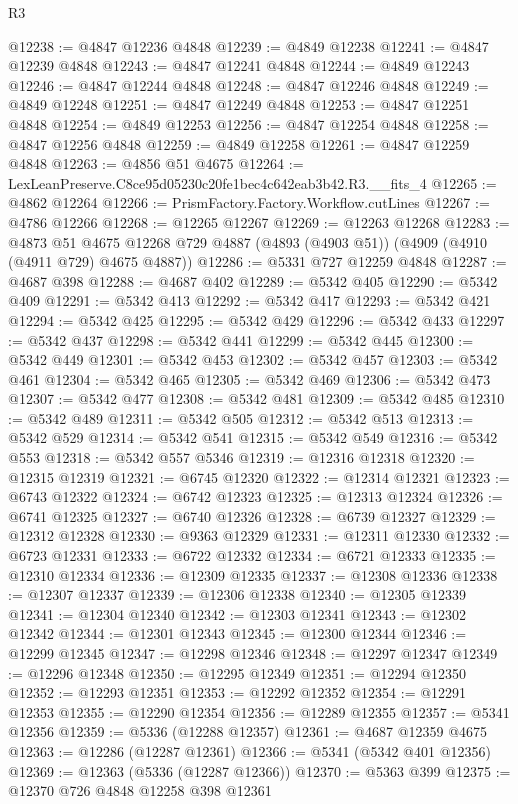 \begin{lexlean}{R3}
\begin{coremodule}
@12238 := @4847 @12236 @4848
@12239 := @4849 @12238
@12241 := @4847 @12239 @4848
@12243 := @4847 @12241 @4848
@12244 := @4849 @12243
@12246 := @4847 @12244 @4848
@12248 := @4847 @12246 @4848
@12249 := @4849 @12248
@12251 := @4847 @12249 @4848
@12253 := @4847 @12251 @4848
@12254 := @4849 @12253
@12256 := @4847 @12254 @4848
@12258 := @4847 @12256 @4848
@12259 := @4849 @12258
@12261 := @4847 @12259 @4848
@12263 := @4856 @51 @4675
@12264 := LexLeanPreserve.C8ce95d05230c20fe1bec4c642eab3b42.R3.__fits_4
@12265 := @4862 @12264
@12266 := PrismFactory.Factory.Workflow.cutLines
@12267 := @4786 @12266
@12268 := @12265 @12267
@12269 := @12263 @12268
@12283 := @4873
    @51
    @4675
    @12268
    @729
    @4887
    (@4893 (@4903 @51))
    (@4909 (@4910 (@4911 @729) @4675 @4887))
@12286 := @5331 @727 @12259 @4848
@12287 := @4687 @398
@12288 := @4687 @402
@12289 := @5342 @405
@12290 := @5342 @409
@12291 := @5342 @413
@12292 := @5342 @417
@12293 := @5342 @421
@12294 := @5342 @425
@12295 := @5342 @429
@12296 := @5342 @433
@12297 := @5342 @437
@12298 := @5342 @441
@12299 := @5342 @445
@12300 := @5342 @449
@12301 := @5342 @453
@12302 := @5342 @457
@12303 := @5342 @461
@12304 := @5342 @465
@12305 := @5342 @469
@12306 := @5342 @473
@12307 := @5342 @477
@12308 := @5342 @481
@12309 := @5342 @485
@12310 := @5342 @489
@12311 := @5342 @505
@12312 := @5342 @513
@12313 := @5342 @529
@12314 := @5342 @541
@12315 := @5342 @549
@12316 := @5342 @553
@12318 := @5342 @557 @5346
@12319 := @12316 @12318
@12320 := @12315 @12319
@12321 := @6745 @12320
@12322 := @12314 @12321
@12323 := @6743 @12322
@12324 := @6742 @12323
@12325 := @12313 @12324
@12326 := @6741 @12325
@12327 := @6740 @12326
@12328 := @6739 @12327
@12329 := @12312 @12328
@12330 := @9363 @12329
@12331 := @12311 @12330
@12332 := @6723 @12331
@12333 := @6722 @12332
@12334 := @6721 @12333
@12335 := @12310 @12334
@12336 := @12309 @12335
@12337 := @12308 @12336
@12338 := @12307 @12337
@12339 := @12306 @12338
@12340 := @12305 @12339
@12341 := @12304 @12340
@12342 := @12303 @12341
@12343 := @12302 @12342
@12344 := @12301 @12343
@12345 := @12300 @12344
@12346 := @12299 @12345
@12347 := @12298 @12346
@12348 := @12297 @12347
@12349 := @12296 @12348
@12350 := @12295 @12349
@12351 := @12294 @12350
@12352 := @12293 @12351
@12353 := @12292 @12352
@12354 := @12291 @12353
@12355 := @12290 @12354
@12356 := @12289 @12355
@12357 := @5341 @12356
@12359 := @5336 (@12288 @12357)
@12361 := @4687 @12359 @4675
@12363 := @12286 (@12287 @12361)
@12366 := @5341 (@5342 @401 @12356)
@12369 := @12363 (@5336 (@12287 @12366))
@12370 := @5363 @399
@12375 := @12370 @726 @4848 @12258 @398 @12361

\end{coremodule}
\end{lexlean}
